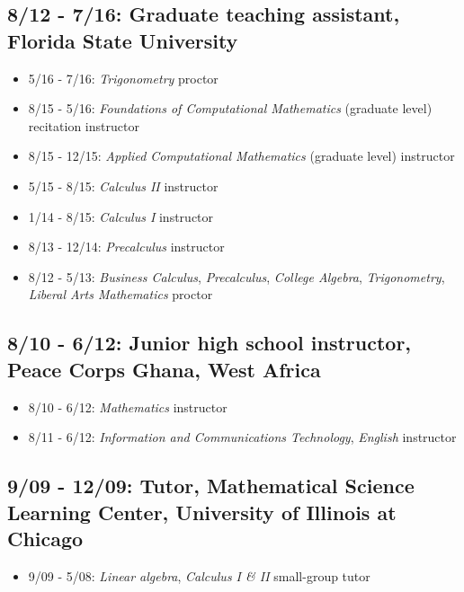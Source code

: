 \documentclass[11pt]{cv}
\begin{document}
\subsection*{8/12 - 7/16: Graduate teaching assistant, Florida State University}
\label{sec:orgheadline12}
\begin{itemize}
\item 5/16 - 7/16: \emph{Trigonometry} proctor\\
\item 8/15 - 5/16: \emph{Foundations of Computational Mathematics} (graduate level) recitation instructor\\
\item 8/15 - 12/15: \emph{Applied Computational Mathematics} (graduate level) instructor\\
\item 5/15 - 8/15: \emph{Calculus II} instructor\\
\item 1/14 - 8/15: \emph{Calculus I} instructor\\
\item 8/13 - 12/14: \emph{Precalculus} instructor\\
\item 8/12 - 5/13: \emph{Business Calculus}, \emph{Precalculus}, \emph{College Algebra}, \emph{Trigonometry}, \emph{Liberal Arts Mathematics} proctor\\
\end{itemize}
\subsection*{8/10 - 6/12: Junior high school instructor, Peace Corps Ghana, West Africa}
\label{sec:orgheadline13}
\begin{itemize}
\item 8/10 - 6/12: \emph{Mathematics} instructor\\
\item 8/11 - 6/12: \emph{Information and Communications Technology}, \emph{English} instructor\\
\end{itemize}
\subsection*{9/09 - 12/09: Tutor, Mathematical Science Learning Center, University of Illinois at Chicago}
\label{sec:orgheadline14}
\begin{itemize}
\item 9/09 - 5/08: \emph{Linear algebra}, \emph{Calculus I \& II} small-group tutor\\
\end{itemize}
\end{document}
